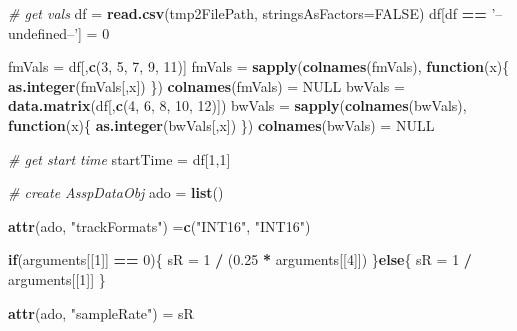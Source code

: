 \documentclass[]{book}
\newenvironment{Shaded}{\begin{snugshade}}{\end{snugshade}}
\newcommand{\CommentTok}[1]{\textcolor[rgb]{0.56,0.35,0.01}{\textit{#1}}}
\newcommand{\ControlFlowTok}[1]{\textcolor[rgb]{0.13,0.29,0.53}{\textbf{#1}}}
\newcommand{\DataTypeTok}[1]{\textcolor[rgb]{0.13,0.29,0.53}{#1}}
\newcommand{\DecValTok}[1]{\textcolor[rgb]{0.00,0.00,0.81}{#1}}
\newcommand{\FloatTok}[1]{\textcolor[rgb]{0.00,0.00,0.81}{#1}}
\newcommand{\KeywordTok}[1]{\textcolor[rgb]{0.13,0.29,0.53}{\textbf{#1}}}
\newcommand{\NormalTok}[1]{#1}
\newcommand{\OperatorTok}[1]{\textcolor[rgb]{0.81,0.36,0.00}{\textbf{#1}}}
\newcommand{\OtherTok}[1]{\textcolor[rgb]{0.56,0.35,0.01}{#1}}
\newcommand{\StringTok}[1]{\textcolor[rgb]{0.31,0.60,0.02}{#1}}
\theoremstyle{definition}
\theoremstyle{definition}
\theoremstyle{definition}
\theoremstyle{remark}
\begin{document}
\begin{Shaded}
\begin{Highlighting}[]
  \CommentTok{# get vals}
\NormalTok{  df =}\StringTok{ }\KeywordTok{read.csv}\NormalTok{(tmp2FilePath, }\DataTypeTok{stringsAsFactors=}\OtherTok{FALSE}\NormalTok{)}
\NormalTok{  df[df }\OperatorTok{==}\StringTok{ '--undefined--'}\NormalTok{] =}\StringTok{ }\DecValTok{0}
  
\NormalTok{  fmVals =}\StringTok{ }\NormalTok{df[,}\KeywordTok{c}\NormalTok{(}\DecValTok{3}\NormalTok{, }\DecValTok{5}\NormalTok{, }\DecValTok{7}\NormalTok{, }\DecValTok{9}\NormalTok{, }\DecValTok{11}\NormalTok{)]}
\NormalTok{  fmVals =}\StringTok{ }\KeywordTok{sapply}\NormalTok{(}\KeywordTok{colnames}\NormalTok{(fmVals), }\ControlFlowTok{function}\NormalTok{(x)\{}
    \KeywordTok{as.integer}\NormalTok{(fmVals[,x])}
\NormalTok{    \})}
  \KeywordTok{colnames}\NormalTok{(fmVals) =}\StringTok{ }\OtherTok{NULL}
\NormalTok{  bwVals =}\StringTok{ }\KeywordTok{data.matrix}\NormalTok{(df[,}\KeywordTok{c}\NormalTok{(}\DecValTok{4}\NormalTok{, }\DecValTok{6}\NormalTok{, }\DecValTok{8}\NormalTok{, }\DecValTok{10}\NormalTok{, }\DecValTok{12}\NormalTok{)])}
\NormalTok{  bwVals =}\StringTok{ }\KeywordTok{sapply}\NormalTok{(}\KeywordTok{colnames}\NormalTok{(bwVals), }\ControlFlowTok{function}\NormalTok{(x)\{}
    \KeywordTok{as.integer}\NormalTok{(bwVals[,x])}
\NormalTok{    \})}
  \KeywordTok{colnames}\NormalTok{(bwVals) =}\StringTok{ }\OtherTok{NULL}
  
  \CommentTok{# get start time}
\NormalTok{  startTime =}\StringTok{ }\NormalTok{df[}\DecValTok{1}\NormalTok{,}\DecValTok{1}\NormalTok{]}

  \CommentTok{# create AsspDataObj}
\NormalTok{  ado =}\StringTok{ }\KeywordTok{list}\NormalTok{()}
  
  \KeywordTok{attr}\NormalTok{(ado, }\StringTok{"trackFormats"}\NormalTok{) =}\KeywordTok{c}\NormalTok{(}\StringTok{"INT16"}\NormalTok{, }\StringTok{"INT16"}\NormalTok{)}
  
  \ControlFlowTok{if}\NormalTok{(arguments[[}\DecValTok{1}\NormalTok{]] }\OperatorTok{==}\StringTok{ }\DecValTok{0}\NormalTok{)\{}
\NormalTok{    sR =}\StringTok{ }\DecValTok{1} \OperatorTok{/}\StringTok{ }\NormalTok{(}\FloatTok{0.25} \OperatorTok{*}\StringTok{ }\NormalTok{arguments[[}\DecValTok{4}\NormalTok{]])}
\NormalTok{  \}}\ControlFlowTok{else}\NormalTok{\{}
\NormalTok{    sR =}\StringTok{ }\DecValTok{1} \OperatorTok{/}\StringTok{ }\NormalTok{arguments[[}\DecValTok{1}\NormalTok{]]}
\NormalTok{  \}}
  
  \KeywordTok{attr}\NormalTok{(ado, }\StringTok{"sampleRate"}\NormalTok{) =}\StringTok{ }\NormalTok{sR}
  

\end{Highlighting}
\end{Shaded}
\end{document}
